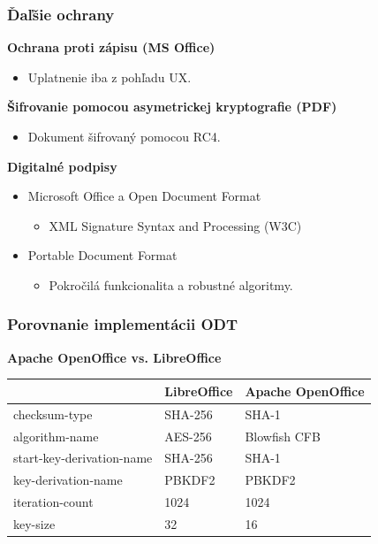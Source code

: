 \documentclass[xcolor=dvipsnames]{beamer}
\def\itemtitle#1{{\bfseries#1\smallskip}}
\begin{document}
\begin{frame}
\frametitle{Ďaľšie ochrany}
	\itemtitle{Ochrana proti zápisu (MS Office)}
	\begin{itemize}
		\item  Uplatnenie iba z pohľadu UX.
	\end{itemize}
	\bigskip
	\itemtitle{Šifrovanie pomocou asymetrickej kryptografie (PDF)}
	\begin{itemize}
		\item Dokument šifrovaný pomocou RC4.	
	\end{itemize}
	\bigskip
	\itemtitle{Digitalné podpisy}
	\begin{itemize}
	\item Microsoft Office a Open Document Format
	\begin{itemize}
		\item  XML Signature Syntax and Processing (W3C)
	\end{itemize}
	\item Portable Document Format
	\begin{itemize}
		\item  Pokročilá funkcionalita a robustné algoritmy.
	\end{itemize}
	\end{itemize}
\end{frame}


\begin{frame}
\frametitle{Porovnanie implementácii ODT}
	\itemtitle{Apache OpenOffice vs. LibreOffice}
	\begin{table}[h]
	\centering
	\begin{tabular}{|l|l|l|}
               \hline
		&\textbf{LibreOffice}&\textbf{Apache OpenOffice}\\
	\hline
		checksum-type&SHA-256&SHA-1\\
	\hline
		algorithm-name&AES-256&Blowfish CFB\\
	\hline
		start-key-derivation-name&SHA-256&SHA-1\\
		key-derivation-name&PBKDF2&PBKDF2\\
		iteration-count&1024&1024\\
		key-size&32&16\\
	\hline
           \end{tabular}
	\end{table}
\end{frame}
\end{document}
